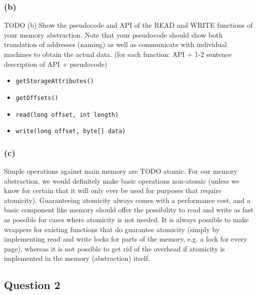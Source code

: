 \documentclass[12pt,a4paper]{article}
\begin{document}
\subsubsection*{(b)}
TODO
(b) Show the pseudocode and API of the READ and WRITE functions of your memory abstraction.
Note that your pseudocode should show both translation of addresses (naming) as well as
communicate with individual machines to obtain the actual data. (for each function: API + 1-2
sentence description of API + pseudocode)
\begin{itemize}
  \item \texttt{getStorageAttributes()}
  \item \texttt{getOffsets()}
  \item \texttt{read(long offset, int length)}
  \item \texttt{write(long offset, byte[] data)}
\end{itemize}


\subsubsection*{(c)}
Simple operations against main memory are TODO atomic. For our memory abstraction, we would definitely make basic operations non-atomic (unless we know for certain that it will only ever be used for purposes that require atomicity). Guaranteeing atomicity always comes with a performance cost, and a basic component like memory should offer the possibility to read and write as fast as possible for cases where atomicity is not needed. It is always possible to make wrappers for existing functions that do guarantee atomicity (simply by implementing read and write locks for parts of the memory, e.g. a lock for every page), whereas it is not possible to get rid of the overhead if atomicity is implemented in the memory (abstraction) itself.

\subsection*{Question 2}
\label{sec:eq2}
\end{document}
